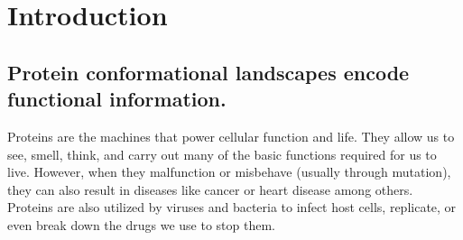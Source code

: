 \documentclass[../main.tex]{subfiles}
\begin{document}
\chapter{Introduction}
    \label{ch:chapter1}
    \captionsetup{labelfont=bf}
    \graphicspath{{Chapter1/}}



\section{Protein conformational landscapes encode functional information.}
	Proteins are the machines that power cellular function and life. They allow us to see, smell, think, and carry out many of the basic functions required for us to live. However, when they malfunction or misbehave (usually through mutation), they can also result in diseases like cancer or heart disease among others. Proteins are also utilized by viruses and bacteria to infect host cells, replicate, or even break down the drugs we use to stop them.
\end{document}
